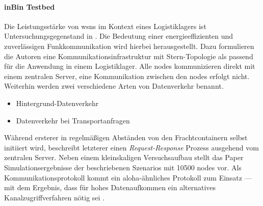 \paragraph{inBin Testbed} Die Leistungsstärke von \acp{wsn} im Kontext eines Logistiklagers ist Untersuchungsgegenstand in \cite{inBinTestbed}. Die Bedeutung einer energieeffizienten und zuverlässigen Funkkommunikation wird hierbei herausgestellt. Dazu formulieren die Autoren eine Kommunikationsinfrastruktur mit Stern-Topologie als passend für die Anwendung in einem Logistiklager. Alle \glspl{node} kommunizieren direkt mit einem zentralen Server, eine Kommunikation zwischen den \glspl{node} erfolgt nicht. Weiterhin werden zwei verschiedene Arten von Datenverkehr benannt.
\begin{itemize}
	\item Hintergrund-Datenverkehr
	\item Datenverkehr bei Transportanfragen
\end{itemize}
Während ersterer in regelmäßigen Abständen von den Frachtcontainern selbst initiiert wird, beschreibt letzterer einen \emph{Request-Response} Prozess ausgehend vom zentralen Server. Neben einem kleinskaligen Versuchsaufbau stellt das Paper Simulationsergebnisse der beschriebenen Szenarios mit 10500 \glspl{node} vor. Als Kommunikationsprotokoll kommt ein \gls{aloha}-ähnliches \citep{aloha} Protokoll zum Einsatz --- mit dem Ergebnis, dass für hohes Datenaufkommen ein alternatives Kanalzugriffverfahren nötig sei \cite{inBinTestbed}.

